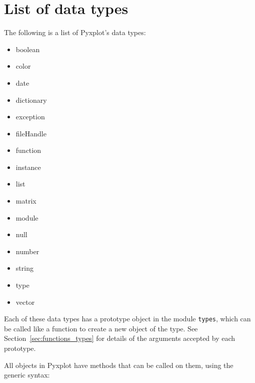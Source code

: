 %
%
%
%
%



\chapter{List of data types}
\label{ch:types_list}

The following is a list of Pyxplot's data types:

\begin{itemize}
\item boolean
\item color
\item date
\item dictionary
\item exception
\item fileHandle
\item function
\item instance
\item list
\item matrix
\item module
\item null
\item number
\item string
\item type
\item vector
\end{itemize}

Each of these data types has a prototype object in the module {\tt types},
which can be called like a function to create a new object of the type. See
Section~\ref{sec:functions_types} for details of the arguments accepted by each
prototype.

All objects in Pyxplot have methods that can be called on them, using the
generic syntax:

